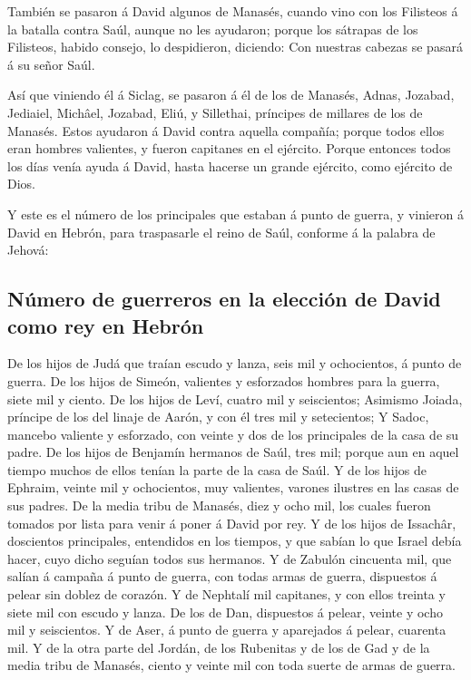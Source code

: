 También se pasaron á David algunos de Manasés, cuando
vino con los Filisteos á la batalla contra Saúl, aunque no les ayudaron;
porque los sátrapas de los Filisteos, habido consejo, lo despidieron,
diciendo: Con nuestras cabezas se pasará á su señor Saúl.

 Así que viniendo él á Siclag, se pasaron á él de los de
Manasés, Adnas, Jozabad, Jediaiel, Michâel, Jozabad, Eliú, y Sillethai,
príncipes de millares de los de Manasés.  Estos ayudaron
á David contra aquella compañía; porque todos ellos eran hombres
valientes, y fueron capitanes en el ejército.  Porque
entonces todos los días venía ayuda á David, hasta hacerse un grande
ejército, como ejército de Dios.

 Y este es el número de los principales que estaban á
punto de guerra, y vinieron á David en Hebrón, para traspasarle el reino
de Saúl, conforme á la palabra de Jehová:

\hypertarget{nuxfamero-de-guerreros-en-la-elecciuxf3n-de-david-como-rey-en-hebruxf3n}{%
\subsection{Número de guerreros en la elección de David como rey en
Hebrón}\label{nuxfamero-de-guerreros-en-la-elecciuxf3n-de-david-como-rey-en-hebruxf3n}}

 De los hijos de Judá que traían escudo y lanza, seis mil
y ochocientos, á punto de guerra.  De los hijos de
Simeón, valientes y esforzados hombres para la guerra, siete mil y
ciento.  De los hijos de Leví, cuatro mil y seiscientos;
 Asimismo Joiada, príncipe de los del linaje de Aarón, y
con él tres mil y setecientos;  Y Sadoc, mancebo valiente
y esforzado, con veinte y dos de los principales de la casa de su padre.
 De los hijos de Benjamín hermanos de Saúl, tres mil;
porque aun en aquel tiempo muchos de ellos tenían la parte de la casa de
Saúl.  Y de los hijos de Ephraim, veinte mil y
ochocientos, muy valientes, varones ilustres en las casas de sus padres.
 De la media tribu de Manasés, diez y ocho mil, los
cuales fueron tomados por lista para venir á poner á David por rey.
 Y de los hijos de Issachâr, doscientos principales,
entendidos en los tiempos, y que sabían lo que Israel debía hacer, cuyo
dicho seguían todos sus hermanos.  Y de Zabulón cincuenta
mil, que salían á campaña á punto de guerra, con todas armas de guerra,
dispuestos á pelear sin doblez de corazón.  Y de Nephtalí
mil capitanes, y con ellos treinta y siete mil con escudo y lanza.
 De los de Dan, dispuestos á pelear, veinte y ocho mil y
seiscientos.  Y de Aser, á punto de guerra y aparejados á
pelear, cuarenta mil.  Y de la otra parte del Jordán, de
los Rubenitas y de los de Gad y de la media tribu de Manasés, ciento y
veinte mil con toda suerte de armas de guerra.


